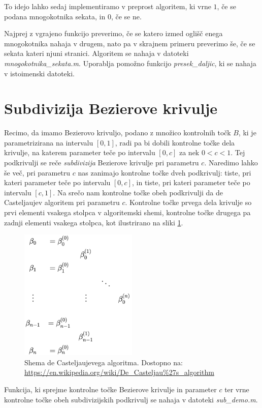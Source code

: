 \documentclass[a4paper, 12pt]{article} %
\begin{document}
To idejo lahko sedaj implementiramo v preprost algoritem, ki vrne $1$, če se podana mnogokotnika sekata, in $0$, če se ne.

Najprej z vgrajeno funkcijo preverimo, če se katero izmed oglišč enega mnogokotnika nahaja v drugem, nato pa v skrajnem primeru preverimo še, če se sekata kateri njuni stranici. Algoritem se nahaja v datoteki \emph{mnogokotnika\_sekata.m}. Uporablja pomožno funkcijo \emph{presek\_daljic}, ki se nahaja v istoimenski datoteki.

\section{Subdivizija Bezierove krivulje}

Recimo, da imamo Bezierovo krivuljo, podano z množico kontrolnih točk $B$, ki je parametrizirana na intervalu $[0, 1]$, radi pa bi dobili kontrolne točke dela krivulje, na katerem parameter teče po intervalu $[0, c]$ za nek $0 < c < 1$. Tej podkrivulji se reče \emph{subdivizija} Bezierove krivulje pri parametru $c$. Naredimo lahko še več, pri parametru $c$ nas zanimajo kontrolne točke dveh podkrivulj: tiste, pri kateri parameter teče po intervalu $[0, c]$, in tiste, pri kateri parameter teče po intervalu $[c, 1]$. Na srečo nam kontrolne točke obeh podkrivulji da de Casteljaujev algoritem pri parametru $c$. Kontrolne točke prvega dela krivulje so prvi elementi vsakega stolpca v algoritemski shemi, kontrolne točke drugega pa zadnji elementi vsakega stolpca, kot ilustrirano na sliki \ref{fig:decastshema}.

\begin{figure}[h]
\centering
\includegraphics[scale=0.6]{deCasteljau}
\caption{Shema de Casteljaujevega algoritma. Dostopno na: \url{https://en.wikipedia.org/wiki/De_Casteljau\%27s\_algorithm}}
\label{fig:decastshema}
\end{figure}

Funkcija, ki sprejme kontrolne točke Bezierove krivulje in parameter $c$ ter vrne kontrolne točke obeh subdivizijskih podkrivulj se nahaja v datoteki \emph{sub\_demo.m}.
\end{document}
